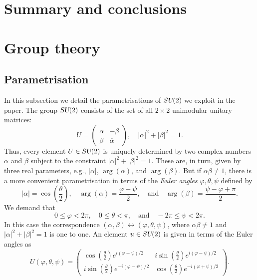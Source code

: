 \documentclass[12pt]{amsart}
\def\su2{\textsl{SU}(2)}
\theoremstyle{definition}
\theoremstyle{remark}
\numberwithin{equation}{section}
\begin{document}
\section{Summary and conclusions}

{}

\newpage
\appendix
\section{Group theory}

\subsection{Parametrisation}
In this subsection we detail the parametrisations of $\su2$ we exploit in the paper. The group $\su2$ consists of the set of all $2\times 2$ unimodular unitary matrices:
\begin{equation}
	U = \begin{pmatrix} \alpha & -\overline{\beta} \\ \beta & \overline{\alpha}\end{pmatrix}, \quad |\alpha|^2 + |\beta|^2 = 1.
\end{equation}
Thus, every element $U\in \su2$ is uniquely determined by two complex numbers $\alpha$ and $\beta$ subject to the constraint $|\alpha|^2 + |\beta|^2 = 1$. These are, in turn, given by three real parameters, e.g., $|\alpha|$, $\arg(\alpha)$, and $\arg(\beta)$. But if $\alpha\beta \not=1$, there is a more convenient parametrisation in terms of the \emph{Euler angles} $\varphi, \theta, \psi$ defined by
\begin{equation}
	|\alpha| = \cos\left(\frac{\theta}{2}\right), \quad \arg(\alpha) = \frac{\varphi +\psi}{2}, \quad \text{and} \quad  \arg(\beta) = \frac{\psi-\varphi + \pi}{2}.
\end{equation}
We demand that
\begin{equation}
	0\le \varphi < 2\pi, \quad 0\le \theta < \pi, \quad \text{and} \quad -2\pi \le \psi < 2\pi.
\end{equation}
In this case the correspondence $(\alpha, \beta) \leftrightarrow (\varphi, \theta, \psi)$, where $\alpha\beta \not=1$ and $|\alpha|^2 + |\beta|^2 = 1$ is one to one. An element $u\in \su2$ is given in terms of the Euler angles as
\begin{equation}
	U(\varphi, \theta, \psi) = \begin{pmatrix} \cos\left(\frac{\theta}{2}\right)e^{i(\varphi+\psi)/2} &  i\sin\left(\frac{\theta}{2}\right)e^{i(\varphi-\psi)/2}\\ i\sin\left(\frac{\theta}{2}\right)e^{-i(\varphi-\psi)/2} & \cos\left(\frac{\theta}{2}\right)e^{-i(\varphi+\psi)/2}\end{pmatrix}.
\end{equation}
\end{document}
